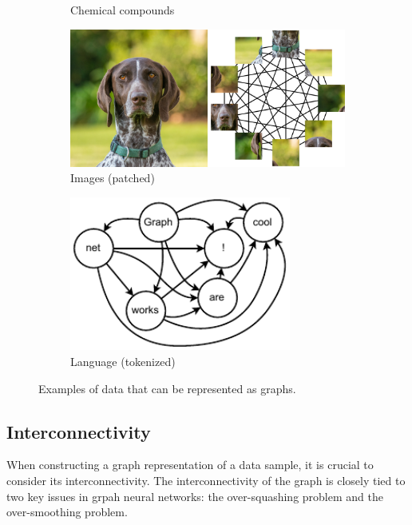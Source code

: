 \begin{figure}
\begin{subfigure}[b]{0.45\textwidth}
        \caption{Chemical compounds}
        \label{fig:chemical}
    \end{subfigure}
    \begin{subfigure}[b]{0.45\textwidth}
        \centering
        \includegraphics[width=\textwidth]{Figures/transformers/patched_image.png}
        \caption{Images (patched)}
        \label{fig:dog}
    \end{subfigure}
    \begin{subfigure}[b]{0.45\textwidth}
        \centering
        \includegraphics[width=0.8\textwidth]{Figures/transformers/text.pdf}
        \caption{Language (tokenized)}
        \label{fig:text}
    \end{subfigure}
    \caption{Examples of data that can be represented as graphs.}
    \label{fig:graph_examples}
\end{figure}

\subsection{Interconnectivity}

When constructing a graph representation of a data sample, it is crucial to consider its interconnectivity.
The interconnectivity of the graph is closely tied to two key issues in grpah neural networks: the over-squashing problem and the over-smoothing problem.

